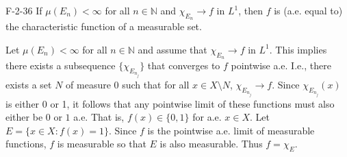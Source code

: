 \documentclass{article}
\begin{document}
	\begin{prb}{F-2-36}
		If $\mu(E_{n}) < \infty$ for all $n \in \mathbb{N}$ and $\chi_{E_{n}} \to f$ in $L^{1}$, then $f$ is (a.e. equal to) the characteristic function of a measurable set. 
	\end{prb}
	Let $\mu(E_{n}) < \infty$ for all $n \in \mathbb{N}$ and assume that $\chi_{E_{n}} \to f$ in $L^{1}$. This implies there exists a subsequence $\{\chi_{E_{n_{j}}}\}$ that converges to $f$ pointwise a.e. I.e., there exists a set $N$ of measure $0$ such that for all $x \in X\setminus N$, $\chi_{E_{n_{j}}} \to f$. Since $\chi_{E_{n_{j}}}(x)$ is either 0 or 1, it follows that any pointwise limit of these functions must also either be $0$ or $1$ a.e. That is, $f(x) \in \{0,1\}$ for a.e. $x \in X$. Let $E = \{x \in X: f(x) = 1\}$. Since $f$ is the pointwise a.e. limit of measurable functions, $f$ is measurable so that $E$ is also measurable. Thus $f = \chi_{E}$. 
	
\end{document}
